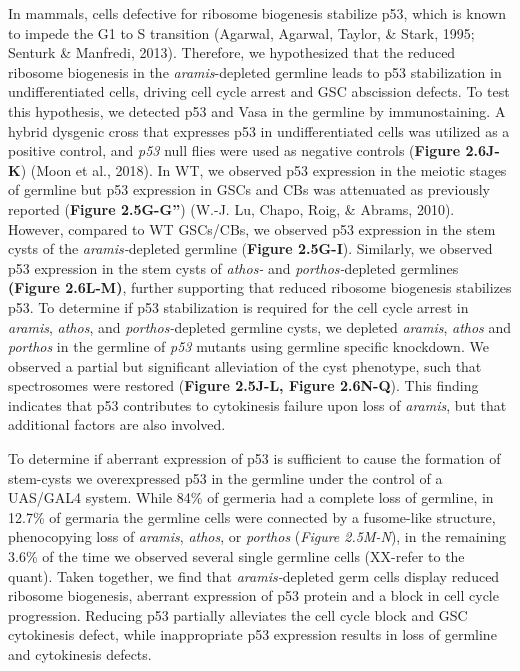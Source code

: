 \documentclass[12pt,oneside]{reedthesis}
\begin{document}
In mammals, cells defective for ribosome biogenesis stabilize p53, which
is known to impede the G1 to S transition (Agarwal, Agarwal, Taylor, \& Stark, 1995; Senturk \& Manfredi, 2013). Therefore, we hypothesized that the reduced
ribosome biogenesis in the \emph{aramis}-depleted germline leads to p53
stabilization in undifferentiated cells, driving cell cycle arrest and
GSC abscission defects. To test this hypothesis, we detected p53 and
Vasa in the germline by immunostaining. A hybrid dysgenic cross that
expresses p53 in undifferentiated cells was utilized as a positive
control, and \emph{p53} null flies were used as negative controls (\textbf{Figure 2.6J-K}) (Moon et al., 2018). In WT, we observed p53 expression in the
meiotic stages of germline but p53 expression in GSCs and CBs was
attenuated as previously reported (\textbf{Figure 2.5G-G''})
(W.-J. Lu, Chapo, Roig, \& Abrams, 2010). However, compared to WT
GSCs/CBs, we observed p53 expression in the stem cysts of the
\emph{aramis-}depleted germline (\textbf{Figure 2.5G-I}). Similarly, we observed p53
expression in the stem cysts of \emph{athos-} and \emph{porthos-}depleted
germlines \textbf{(Figure 2.6L-M)}, further supporting that reduced ribosome
biogenesis stabilizes p53. To determine if p53 stabilization is required
for the cell cycle arrest in \emph{aramis}, \emph{athos}, and \emph{porthos-}depleted
germline cysts, we depleted \emph{aramis}, \emph{athos} and \emph{porthos} in the
germline of \emph{p53} mutants using germline specific knockdown. We observed
a partial but significant alleviation of the cyst phenotype, such that
spectrosomes were restored (\textbf{Figure 2.5J-L, Figure 2.6N-Q}). This finding
indicates that p53 contributes to cytokinesis failure upon loss of
\emph{aramis}, but that additional factors are also involved.

To determine if aberrant expression of p53 is sufficient to cause the
formation of stem-cysts we overexpressed p53 in the germline under the
control of a UAS/GAL4 system. While 84\% of germeria had a complete loss
of germline, in 12.7\% of germaria the germline cells were connected by a
fusome-like structure, phenocopying loss of \emph{aramis}, \emph{athos}, or
\emph{porthos} (\emph{Figure 2.5M-N}), in the remaining 3.6\% of the time we observed
several single germline cells (XX-refer to the quant). Taken together,
we find that \emph{aramis-}depleted germ cells display reduced ribosome
biogenesis, aberrant expression of p53 protein and a block in cell cycle
progression. Reducing p53 partially alleviates the cell cycle block and
GSC cytokinesis defect, while inappropriate p53 expression results in
loss of germline and cytokinesis defects.
\end{document}
